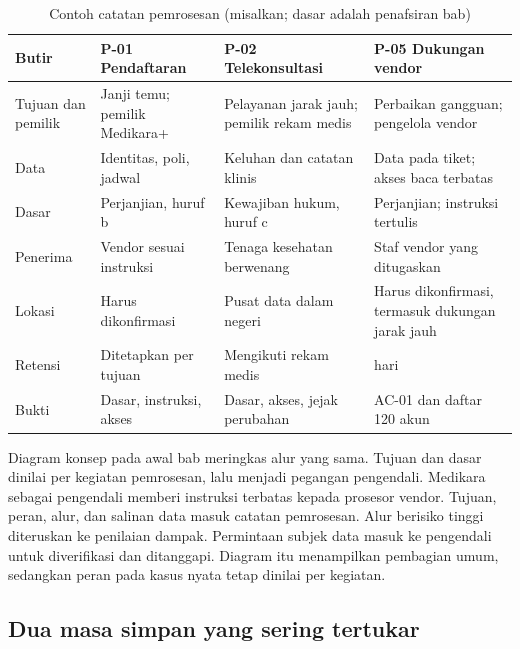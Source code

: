\begin{table}[!htb]
  \centering\small
  \caption{Contoh catatan pemrosesan (misalkan; dasar adalah penafsiran bab)}\label{tab:ch07-ropa}
  \begin{tabularx}{\textwidth}{|>{\raggedright\arraybackslash}p{}|>{\raggedright\arraybackslash}X|>{\raggedright\arraybackslash}X|>{\raggedright\arraybackslash}X|}
    \hline
    \textbf{Butir} & \textbf{P-01 Pendaftaran} & \textbf{P-02 Telekonsultasi} & \textbf{P-05
    Dukungan vendor} \\ \hline
    Tujuan dan pemilik & Janji temu; pemilik Medikara+ & Pelayanan jarak jauh; pemilik rekam medis &
    Perbaikan gangguan; pengelola vendor \\ \hline
    Data & Identitas, poli, jadwal & Keluhan dan catatan klinis & Data pada tiket; akses baca
    terbatas \\ \hline
    Dasar & Perjanjian, huruf b & Kewajiban hukum, huruf c & Perjanjian; instruksi tertulis \\
    \hline
    Penerima & Vendor sesuai instruksi & Tenaga kesehatan berwenang & Staf vendor yang ditugaskan \\
    \hline
    Lokasi & Harus dikonfirmasi & Pusat data dalam negeri & Harus dikonfirmasi, termasuk dukungan
    jarak jauh \\ \hline
    Retensi & Ditetapkan per tujuan & Mengikuti rekam medis & 90 hari \\ \hline
    Bukti & Dasar, instruksi, akses & Dasar, akses, jejak perubahan & AC-01 dan daftar 120 akun \\
    \hline
  \end{tabularx}
\end{table}

Diagram konsep pada awal bab meringkas alur yang sama. Tujuan dan dasar dinilai per kegiatan
pemrosesan, lalu menjadi pegangan pengendali. Medikara sebagai pengendali memberi instruksi terbatas
kepada prosesor vendor. Tujuan, peran, alur, dan salinan data masuk catatan pemrosesan. Alur
berisiko tinggi diteruskan ke penilaian dampak. Permintaan subjek data masuk ke pengendali untuk
diverifikasi dan ditanggapi. Diagram itu menampilkan pembagian umum, sedangkan peran pada kasus
nyata tetap dinilai per kegiatan.

\subsection*{Dua masa simpan yang sering tertukar}

